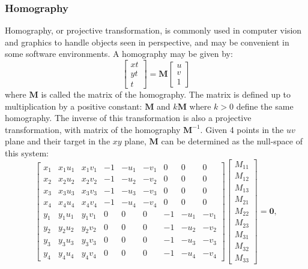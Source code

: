 \documentclass{amsart}[12pt]
\begin{document}
\subsubsection{Homography}
Homography, or projective transformation, is commonly used in computer vision
and graphics to handle objects seen in perspective, and may be convenient in
some software environments. A homography may be given by:
\begin{equation}
  \begin{bmatrix} xt \\ yt \\ t \end{bmatrix}
  = \mathbf{M} \begin{bmatrix} u  \\ v \\ 1  \end{bmatrix}
\end{equation}
where $\mathbf{M}$ is called the matrix of the homography. The matrix is
defined up to multiplication by a positive constant: $\mathbf{M}$ and
$k\mathbf{M}$ where $k>0$ define the same homography. The inverse of this
transformation is also a projective transformation, with matrix of the
homography $\mathbf{M}^{-1}$. Given 4 points in the $uv$ plane and their target
in the $xy$ plane, $\mathbf{M}$ can be determined as the null-space of this
system:
\begin{equation}
  \begin{bmatrix}
  x_1 & x_1 u_1 & x_1 v_1 & -1 & -u_1 & -v_1 & 0 & 0 & 0 \\
  x_2 & x_2 u_2 & x_2 v_2 & -1 & -u_2 & -v_2 & 0 & 0 & 0 \\
  x_3 & x_3 u_3 & x_3 v_3 & -1 & -u_3 & -v_3 & 0 & 0 & 0 \\
  x_4 & x_4 u_4 & x_4 v_4 & -1 & -u_4 & -v_4 & 0 & 0 & 0 \\
  y_1 & y_1 u_1 & y_1 v_1 & 0 & 0 & 0 & -1 & -u_1 & -v_1 \\
  y_2 & y_2 u_2 & y_2 v_2 & 0 & 0 & 0 & -1 & -u_2 & -v_2 \\
  y_3 & y_3 u_3 & y_3 v_3 & 0 & 0 & 0 & -1 & -u_3 & -v_3 \\
  y_4 & y_4 u_4 & y_4 v_4 & 0 & 0 & 0 & -1 & -u_4 & -v_4
   \end{bmatrix}
   \begin{bmatrix}
  M_{11} \\ M_{12} \\ M_{13} \\
  M_{21} \\ M_{22} \\ M_{23} \\
  M_{31} \\ M_{32} \\ M_{33}
  \end{bmatrix} = \mathbf{0},
\end{equation}
\end{document}
